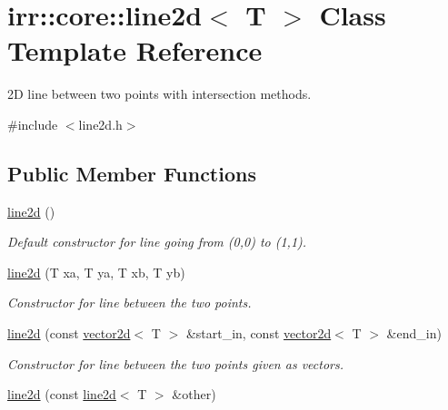 \hypertarget{classirr_1_1core_1_1line2d}{}\section{irr\+:\+:core\+:\+:line2d$<$ T $>$ Class Template Reference}
\label{classirr_1_1core_1_1line2d}


2D line between two points with intersection methods.  




{\ttfamily \#include $<$line2d.\+h$>$}

\subsection*{Public Member Functions}
\begin{DoxyCompactItemize}
\item 
\hyperlink{classirr_1_1core_1_1line2d_a7d0f25f93572eb73734da83da8490410}{line2d} ()\hypertarget{classirr_1_1core_1_1line2d_a7d0f25f93572eb73734da83da8490410}{}\label{classirr_1_1core_1_1line2d_a7d0f25f93572eb73734da83da8490410}

\begin{DoxyCompactList}\small\item\em Default constructor for line going from (0,0) to (1,1). \end{DoxyCompactList}\item 
\hyperlink{classirr_1_1core_1_1line2d_af9614350cdb0527c190dcf3342ecb42e}{line2d} (T xa, T ya, T xb, T yb)\hypertarget{classirr_1_1core_1_1line2d_af9614350cdb0527c190dcf3342ecb42e}{}\label{classirr_1_1core_1_1line2d_af9614350cdb0527c190dcf3342ecb42e}

\begin{DoxyCompactList}\small\item\em Constructor for line between the two points. \end{DoxyCompactList}\item 
\hyperlink{classirr_1_1core_1_1line2d_a2e0935715c84712f48eeb492f689d5b0}{line2d} (const \hyperlink{classirr_1_1core_1_1vector2d}{vector2d}$<$ T $>$ \&start\+\_\+in, const \hyperlink{classirr_1_1core_1_1vector2d}{vector2d}$<$ T $>$ \&end\+\_\+in)\hypertarget{classirr_1_1core_1_1line2d_a2e0935715c84712f48eeb492f689d5b0}{}\label{classirr_1_1core_1_1line2d_a2e0935715c84712f48eeb492f689d5b0}

\begin{DoxyCompactList}\small\item\em Constructor for line between the two points given as vectors. \end{DoxyCompactList}\item 
\hyperlink{classirr_1_1core_1_1line2d_a19338e17d69fa3062709ebd7b7f73409}{line2d} (const \hyperlink{classirr_1_1core_1_1line2d}{line2d}$<$ T $>$ \&other)\hypertarget{classirr_1_1core_1_1line2d_a19338e17d69fa3062709ebd7b7f73409}{}\label{classirr_1_1core_1_1line2d_a19338e17d69fa3062709ebd7b7f73409}


\end{DoxyCompactItemize}
